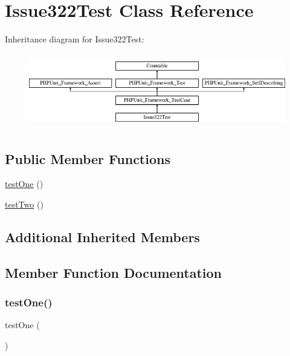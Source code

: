 \hypertarget{class_issue322_test}{}\section{Issue322\+Test Class Reference}
\label{class_issue322_test}
Inheritance diagram for Issue322\+Test\+:\begin{figure}[H]
\begin{center}
\leavevmode
\includegraphics[height=3.303835cm]{class_issue322_test}
\end{center}
\end{figure}
\subsection*{Public Member Functions}
\begin{DoxyCompactItemize}
\item 
\mbox{\hyperlink{class_issue322_test_afbf3ff88b322c6a7197ce02297cd23a0}{test\+One}} ()
\item 
\mbox{\hyperlink{class_issue322_test_a4fb9974ce113d5d1db8075e0db0dc9b6}{test\+Two}} ()
\end{DoxyCompactItemize}
\subsection*{Additional Inherited Members}


\subsection{Member Function Documentation}
\mbox{\label{class_issue322_test_afbf3ff88b322c6a7197ce02297cd23a0}} 
\subsubsection{\texorpdfstring{test\+One()}{testOne()}}
{\footnotesize\ttfamily test\+One (\begin{DoxyParamCaption}{ }\end{DoxyParamCaption})}

